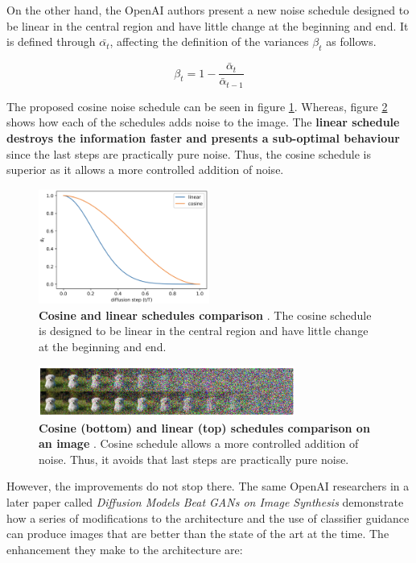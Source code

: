 On the other hand, the OpenAI authors present a new noise schedule designed to be linear in the central region and have little change at the beginning and end. It is defined through $ \bar{\alpha_t}$, affecting the definition of the variances $\beta_t$ as follows.

\[\beta_t = 1 - \frac{\bar{\alpha}_t}{\bar{\alpha}_{t-1}}\]

The proposed cosine noise schedule can be seen in figure \ref{fig:CosineSC}. Whereas, figure \ref{fig:CosineEX} shows how each of the schedules adds noise to the image. The \textbf{linear schedule destroys the information faster and presents a sub-optimal behaviour} since the last steps are practically pure noise. Thus, the cosine schedule is superior as it allows a more controlled addition of noise.

\begin{figure}
    \centering
    \includegraphics[width=0.5\textwidth]{Pictures/cosineSC.png} 
    \caption{\textbf{Cosine and linear schedules comparison }\cite{nichol2021improved}. The cosine schedule is designed to be linear in the central region and have little change at the beginning and end.}
    \label{fig:CosineSC}
\end{figure}

\begin{figure}
    \centering
    \includegraphics[width=0.75\textwidth]{Pictures/cosineEX.png} 
    \caption{\textbf{Cosine (bottom) and linear (top) schedules comparison on an image} \cite{nichol2021improved}. Cosine schedule allows a more controlled addition of noise. Thus, it avoids that last steps are practically pure noise.}
    \label{fig:CosineEX}
\end{figure}

However, the improvements do not stop there. The same OpenAI researchers in a later paper called \textit{Diffusion Models Beat GANs on Image Synthesis} \cite{dhariwal2021diffusion} demonstrate how a series of modifications to the architecture and the use of classifier guidance can produce images that are better than the state of the art at the time. The enhancement they make to the architecture are:

